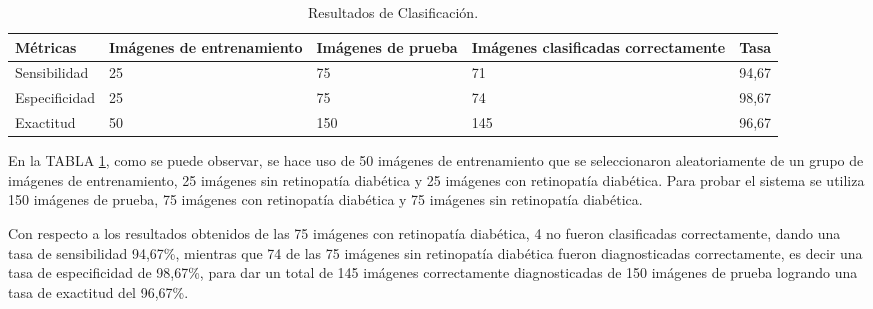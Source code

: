 \begin{table}[!hbtp]
\begin{center}
\caption{Resultados de Clasificación.}
\resizebox{15cm}{!} {
\begin{tabular}{|p{2.2cm}|p{1.9cm}|p{2.2cm}|p{2.4cm}|p{2cm}|}

\hline
Métricas &  Imágenes de entrenamiento & Imágenes de prueba  & Imágenes clasificadas correctamente  & Tasa \\ 
\hline
Sensibilidad & 25 & 75 & 71 & 94,67 \\
Especificidad & 25 & 75 & 74 & 98,67  \\
Exactitud  & 50 & 150  & 145  & 96,67\\
\hline
\end{tabular}
}

\label{tab:resultados}
\end{center}
\end{table}


En la TABLA \ref{tab:resultados}, como se puede observar, se hace uso de 50 imágenes de entrenamiento que se seleccionaron aleatoriamente de un grupo de imágenes de entrenamiento, 25 imágenes sin retinopatía diabética y 25 imágenes con retinopatía diabética. Para probar el sistema se utiliza 150 imágenes de prueba, 75 imágenes con retinopatía diabética y 75 imágenes sin retinopatía diabética.

 Con respecto a los resultados obtenidos de las 75 imágenes con retinopatía diabética, 4 no fueron clasificadas correctamente, dando una tasa de sensibilidad 94,67\%, mientras que 74  de las 75 imágenes sin retinopatía diabética fueron diagnosticadas correctamente, es decir una tasa de especificidad de 98,67\%, para dar un total de 145 imágenes correctamente diagnosticadas de 150 imágenes de prueba logrando una tasa de exactitud del 96,67\%.




